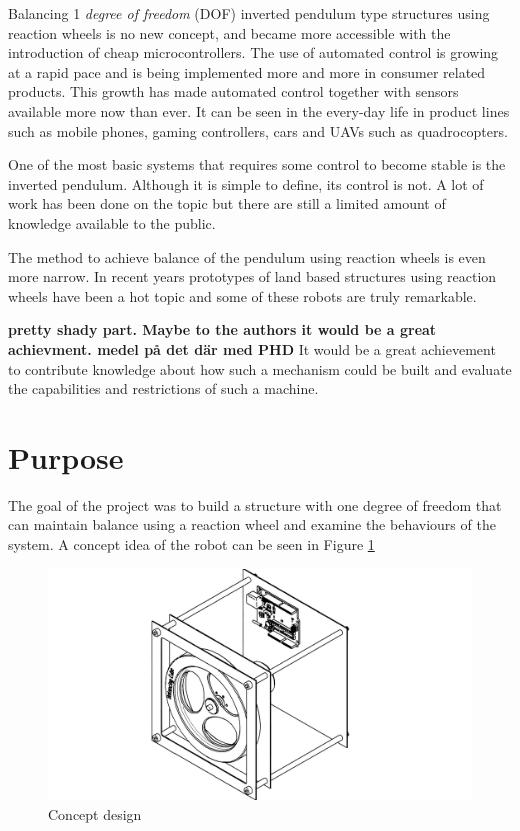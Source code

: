 \documentclass[a4paper,11pt]{kth-mag}
\begin{document}
Balancing 1 \textit{degree of freedom} (DOF) inverted pendulum type structures using reaction wheels is no
new concept, and became more accessible with the introduction of cheap microcontrollers.
The use of automated control is growing at a rapid pace and is being implemented
more and more in consumer related products.  This growth
has made automated control together with sensors available more now than ever. It can be seen in the every-day life in product lines such as mobile phones, gaming controllers, cars and UAVs such as quadrocopters.

One of the most basic systems that requires some control to become stable is the inverted pendulum. 
Although it is simple to define, its control is not. A lot of work has been done on the topic
but there are still a limited amount of knowledge available to the public. 

The method to achieve balance of the pendulum using reaction wheels is even more narrow. 
In recent years prototypes of land based structures using reaction wheels have been a hot topic and some of these robots are truly remarkable. 

\textbf{pretty shady part. Maybe to the authors it would be a great achievment. medel på det där med PHD }
It would be a great achievement to contribute knowledge about how such a mechanism could be built and evaluate
the capabilities and restrictions of such a machine.


\section{Purpose}
The goal of the project was to build a structure with one degree of freedom that can maintain balance using a reaction wheel and examine the behaviours of the system. A concept idea of the robot can be seen in Figure \ref{Figure: concept idea}
\begin{figure}[!htb] 
\centering
\includegraphics[width = \textwidth]{concept.pdf}
\caption{Concept design}
\label{Figure: concept idea}
\end{figure}
\end{document}
